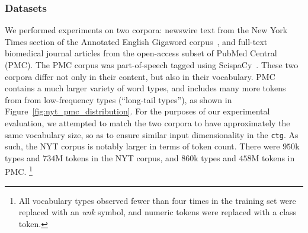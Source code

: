 \documentclass[11pt,a4paper]{article}
\begin{document}
\subsubsection{Datasets}
We performed experiments on two corpora: newswire text from the New York Times section of the Annotated English Gigaword corpus~\citep[LDC2018T20]{ferraro2018english}, and full-text biomedical journal articles from the open-access subset of PubMed Central~\citep{beck2010report} (PMC). The PMC corpus was part-of-speech tagged using ScispaCy~\citep[Version 0.2.2, model: \texttt{en\_core\_sci\_md}]{Neumann2019ScispaCyFA}. 
These two corpora differ not only in their content, but also in their vocabulary.
PMC contains a much larger variety of word types, and includes many more tokens from from low-frequency types (``long-tail types''), as shown in Figure~\ref{fig:nyt_pmc_distribution}.
For the purposes of our experimental evaluation, we attempted to match the two corpora to have approximately the same vocabulary size, so as to ensure similar input dimensionality in the {\tt ctg}. As such, the NYT corpus is notably larger in terms of token count. 
There were $950$k types and $734$M tokens in the NYT corpus, and $860$k types and $458$M tokens in PMC.
\footnote{All vocabulary types observed fewer than four times in the training set were replaced with an \textit{unk} symbol, and numeric tokens were replaced with a class token.}

\end{document}
